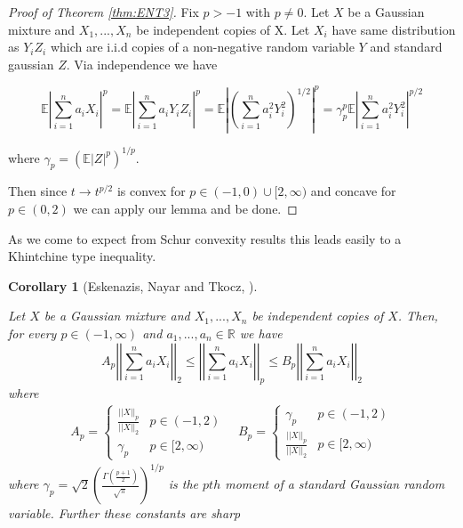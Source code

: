 \documentclass[10pt]{article}
\newcommand{\E}{\mathbb{E}}
\newcommand{\1}{\textbf{1}}
\newcommand{\R}{\mathbb{R}}
\newcommand{\norm}[1]{\left\lvert\left\lvert#1\right\rvert\right\rvert}
\newtheorem{corollary}{Corollary}[subsection]
\theoremstyle{remark}
\theoremstyle{definition}
\begin{document}
\begin{proof}[Proof of Theorem \ref{thm:ENT3}]

Fix $p > -1$ with $p \neq 0$. Let $X$ be a Gaussian mixture and $X_1,...,X_n$ be independent copies of X. Let $X_i$ have same distribution as $Y_iZ_i$ which are i.i.d copies of a non-negative random variable $Y$ and standard gaussian $Z$. Via independence we have

\begin{equation*}
	\E|\sum_{i=1}^n a_iX_i|^p = \E|\sum_{i=1}^n a_i Y_i Z_i|^p = \E|(\sum_{i=1}^na_i^2Y_i^2)^{1/2}|^p = \gamma_p^p \E|\sum_{i=1}^n a_i^2Y_i^2|^{p/2}
\end{equation*} 

where $\gamma_p = (\E|Z|^p)^{1/p}$. 

Then since $t \to t^{p/2}$ is convex for $p \in (-1,0) \cup [2,\infty)$ and concave for $p \in (0,2)$ we can apply our lemma and be done.

\end{proof}

As we come to expect from Schur convexity results this leads easily to a Khintchine type inequality.

\begin{corollary}[Eskenazis, Nayar and Tkocz, \cite{ENT}]\label{cor:ENT23}

	Let $X$ be a Gaussian mixture and $X_1,...,X_n$ be independent copies of $X$. Then, for every $p \in (-1,\infty)$ and $a_1,...,a_n \in \R$ we have
	\begin{equation}
		A_p \left|\left| \sum_{i=1}^n a_iX_i \right|\right|_2 \leq \left| \left|\sum_{i=1}^n a_i X_i\right| \right|_p \leq B_p \left| \left| \sum_{i=1}^n a_i X_i\right|\right|_2
	\end{equation}
	where
	\begin{align}
		A_p =
		\begin{cases}
			\frac{\norm{X}_p}{\left|\left| X\right|\right|_2} & p \in (-1,2)\\
			\gamma_p & p \in [2,\infty)
		\end{cases}
		\quad
		B_p =
		\begin{cases}
			\gamma_p & p \in (-1,2)\\
			\frac{\norm{X}_p}{\norm{X}_2} & p \in [2,\infty)
		\end{cases}
	\end{align}	
	where $\gamma_p = \sqrt{2}(\frac{\Gamma(\frac{p+1}{2})}{\sqrt{\pi}})^{1/p}$ is the $pth$ moment of a standard Gaussian random variable. Further these constants are sharp
\end{corollary}
\end{document}
